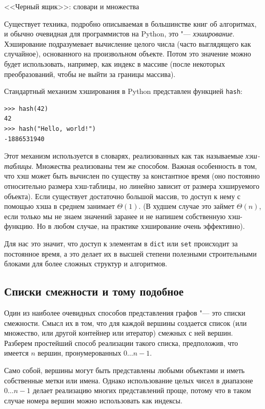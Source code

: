 \begin{notice}{<<Черный ящик>>: словари и множества}

Существует техника, подробно описываемая в большинстве книг об алгоритмах, и обычно очевидная для программистов на Python, это "--- \textit{хэширование}. Хэширование подразумевает вычисление целого числа (часто выглядящего как случайное), основанного на произвольном объекте. Потом это значение можно будет использовать, например, как индекс в массиве (после некоторых преобразований, чтобы не выйти за границы массива).

Стандартный механизм хэширования в Python представлен функцией \texttt{hash}:
\begin{lstlisting}
>>> hash(42)
42
>>> hash("Hello, world!")
-1886531940
\end{lstlisting}

Этот механизм используется в словарях, реализованных как так называемые \textit{хэш-таблицы}. Множества реализованы тем же способом. Важная особенность в том, что хэш может быть вычислен по существу за константное время (оно постоянно относительно размера хэш-таблицы, но линейно зависит от размера хэшируемого объекта). Если существует достаточно большой массив, то доступ к нему с помощью хэша в среднем занимает $\Theta(1)$. (В худшем случае это займет $\Theta(n)$, если только мы не знаем значений заранее и не напишем собственную хэш-функцию. Но в любом случае, на практике хэширование очень эффективно). 

Для нас это значит, что доступ к элементам в \texttt{dict} или \texttt{set} происходит за постоянное время, а это делает их в высшей степени полезными строительными блоками для более сложных структур и алгоритмов.
\end{notice}


\subsection{Списки смежности и тому подобное}
\label{sec:adjacency-lists}

Один из наиболее очевидных способов представления графов "--- это списки смежности. Смысл их в том, что для каждой вершины создается список (или множество, или другой контейнер или итератор) смежных с ней вершин. Разберем простейший способ реализации такого списка, предположив, что имеется $n$ вершин, пронумерованных $0\ldots n-1$.

\begin{note}
Само собой, вершины могут быть представлены любыми объектами и иметь собственные метки или имена. Однако использование целых чисел в диапазоне $0\ldots n-1$ делает реализацию многих представлений проще, потому что в таком случае номера вершин можно использовать как индексы.
\end{note}

